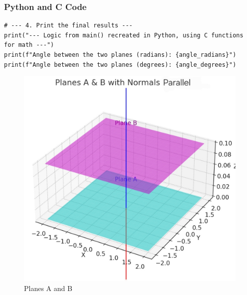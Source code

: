 \documentclass{beamer}
\begin{document}
\begin{frame}[fragile]
\frametitle{Python and C Code}

\begin{lstlisting}
# --- 4. Print the final results ---
print("--- Logic from main() recreated in Python, using C functions for math ---")
print(f"Angle between the two planes (radians): {angle_radians}")
print(f"Angle between the two planes (degrees): {angle_degrees}")
\end{lstlisting}

\end{frame}
\begin{frame}
\begin{figure}
    \centering
    \includegraphics[width=0.75\columnwidth]{graph .jpg}
    \caption{Planes A and B}
    \label{fig:placeholder}
\end{figure}
\end{frame}
\end{document}
